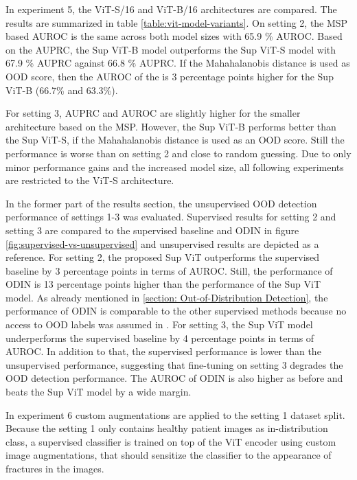 In experiment 5, the ViT-S/16 and ViT-B/16 architectures are compared.
The results are summarized in table \ref{table:vit-model-variants}.
On setting 2, the MSP based AUROC is the same across both model sizes with 65.9 \% AUROC.
Based on the AUPRC, the Sup ViT-B model outperforms the Sup ViT-S model with 67.9 \% AUPRC against 66.8 \% AUPRC.
If the Mahahalanobis distance is used as OOD score, then the AUROC of the is 3 percentage points higher for the Sup ViT-B (66.7\% and 63.3\%).
\par
For setting 3, AUPRC and AUROC are slightly higher for the smaller architecture based on the MSP.
However, the Sup ViT-B performs better than the Sup ViT-S, if the Mahahalanobis distance is used as an OOD score.
Still the performance is worse than on setting 2 and close to random guessing.
Due to only minor performance gains and the increased model size, all following experiments are restricted to the ViT-S architecture.
\par
{}
In the former part of the results section, the unsupervised OOD detection performance of settings 1-3 was evaluated.
Supervised results for setting 2 and setting 3 are compared to the supervised baseline and ODIN in figure \ref{fig:supervised-vs-unsupervised} and unsupervised results are depicted as a reference.
For setting 2, the proposed Sup ViT outperforms the supervised baseline by 3 percentage points in terms of AUROC.
Still, the performance of ODIN is 13 percentage points higher than the performance of the Sup ViT model.
As already mentioned in \ref{section: Out-of-Distribution Detection}, the performance of ODIN is comparable to the other supervised methods because no access to OOD labels was assumed in \citep{Berger2021}.
For setting 3, the Sup ViT model underperforms the supervised baseline by 4 percentage points in terms of AUROC.
In addition to that, the supervised performance is lower than the unsupervised performance, suggesting that fine-tuning on setting 3 degrades the OOD detection performance.
The AUROC of ODIN is also higher as before and beats the Sup ViT model by a wide margin.
\par
In experiment 6 custom augmentations are applied to the setting 1 dataset split.
Because the setting 1 only contains healthy patient images as in-distribution class, a supervised classifier is trained on top of the ViT encoder using custom image augmentations, that should sensitize the classifier to the appearance of fractures in the images.
